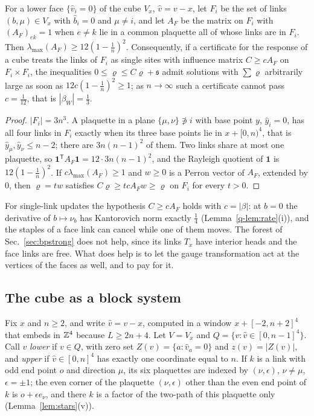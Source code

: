 \begin{proposition}\label{prop:facebarrier}
For a lower face $\{\hat v_i=0\}$ of the cube $V_x$, $\hat v=v-x$, let $F_i$ be
the set of links $(b,\mu)\in V_x$ with $\hat b_i=0$ and $\mu\ne i$, and let
$A_F$ be the matrix on $F_i$ with $(A_F)_{ek}=1$ when $e\ne k$ lie in a common
plaquette all of whose links are in $F_i$. Then $\lambda_{\max}(A_F)\ge
12(1-\frac1n)^2$. Consequently, if a certificate for the response of a cube
treats the links of $F_i$ as single sites with influence matrix $C\ge cA_F$ on
$F_i\times F_i$, the inequalities $0\le\varrho\le C\varrho+\mathfrak s$ admit
solutions with $\sum\varrho$ arbitrarily large as soon as
$12c(1-\frac1n)^2\ge1$; as $n\to\infty$ such a certificate cannot pass
$c=\frac1{12}$, that is $|\beta_W|=\frac13$.
\end{proposition}

\begin{proof}
$|F_i|=3n^3$. A plaquette in a plane $\{\mu,\nu\}\not\ni i$ with base point
$y$, $\hat y_i=0$, has all four links in $F_i$ exactly when its three base
points lie in $x+[0,n)^4$, that is $\hat y_\mu,\hat y_\nu\le n-2$; there are
$3n(n-1)^2$ of them. Two links share at most one plaquette, so
$\mathbf 1^{\mathsf T}A_F\mathbf 1=12\cdot3n(n-1)^2$, and the Rayleigh quotient
of $\mathbf 1$ is $12(1-\frac1n)^2$. If $c\lambda_{\max}(A_F)\ge1$ and $w\ge0$
is a Perron vector of $A_F$, extended by $0$, then $\varrho=tw$ satisfies
$C\varrho\ge tcA_Fw\ge\varrho$ on $F_i$ for every $t>0$.
\end{proof}

For single-link updates the hypothesis $C\ge cA_F$ holds with $c=|\beta|$: at
$b=0$ the derivative of $b\mapsto\nu_b$ has Kantorovich norm exactly
$\frac14$ (Lemma~\ref{q-lem:rate}(i)), and the staples of a face link can
cancel while one of them moves. The forest of Sec.~\ref{sec:bpstrong} does not
help, since its links $T_x$ have interior heads and the face links are free.
What does help is to let the gauge transformation act at the vertices of the
faces as well, and to pay for it.

\subsection{The cube as a block system}

Fix $x$ and $n\ge2$, and write $\hat v=v-x$, computed in a window
$x+[-2,n+2]^4$ that embeds in $\mathbb{Z}^4$ because $L\ge2n+4$. Let $V=V_x$ and
$Q=\{v:\hat v\in[0,n-1]^4\}$. Call $v$ \emph{lower} if $v\in Q$, with zero set
$Z(v)=\{a:\hat v_a=0\}$ and $z(v)=|Z(v)|$, and \emph{upper} if $\hat v\in
[0,n]^4$ has exactly one coordinate equal to $n$. If $k$ is a link with odd end
point $o$ and direction $\mu$, its six plaquettes are indexed by $(\nu,
\epsilon)$, $\nu\ne\mu$, $\epsilon=\pm1$; the even corner of the plaquette
$(\nu,\epsilon)$ other than the even end point of $k$ is $o+\epsilon e_\nu$,
and there $k$ is a factor of the two-path of this plaquette only
(Lemma~\ref{lem:stars}(v)).


